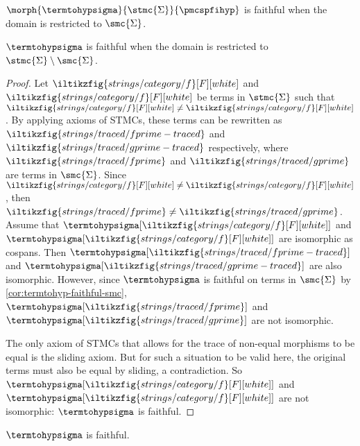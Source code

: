 \begin{corollary}\label{cor:termtohyp-faithful-smc}
    \(\morph{\termtohypsigma}{\stmc{\Sigma}}{\pmcspfihyp}\) is faithful when the domain is restricted to \(\smc{\Sigma}\).
\end{corollary}

\begin{theorem}
    \(\termtohypsigma\) is faithful when the domain is restricted to \(\stmc{\Sigma} \setminus \smc{\Sigma}\).
\end{theorem}
\begin{proof}
    Let \(\iltikzfig{strings/category/f}[F][white]\) and \(\iltikzfig{strings/category/f}[F][white]\) be terms in \(\stmc{\Sigma}\) such that \(\iltikzfig{strings/category/f}[F][white] \neq \iltikzfig{strings/category/f}[F][white]\).
    By applying axioms of STMCs, these terms can be rewritten as \(\iltikzfig{strings/traced/fprime-traced}\) and \(\iltikzfig{strings/traced/gprime-traced}\) respectively, where \(\iltikzfig{strings/traced/fprime}\) and \(\iltikzfig{strings/traced/gprime}\) are terms in \(\smc{\Sigma}\).
    Since \(\iltikzfig{strings/category/f}[F][white] \neq \iltikzfig{strings/category/f}[F][white]\), then \(\iltikzfig{strings/traced/fprime} \neq \iltikzfig{strings/traced/gprime}\).
    Assume that \(\termtohypsigma[\iltikzfig{strings/category/f}[F][white]]\) and \(\termtohypsigma[\iltikzfig{strings/category/f}[F][white]]\) are isomorphic as cospans.
    Then \(\termtohypsigma[\iltikzfig{strings/traced/fprime-traced}]\) and \(\termtohypsigma[\iltikzfig{strings/traced/gprime-traced}]\) are also isomorphic.
    However, since \(\termtohypsigma\) is faithful on terms in \(\smc{\Sigma}\)
    by \cref{cor:termtohyp-faithful-smc}, \(
        \termtohypsigma[\iltikzfig{strings/traced/fprime}]
    \) and \(
        \termtohypsigma[\iltikzfig{strings/traced/gprime}]
    \) are not isomorphic.

    The only axiom of STMCs that allows for the trace of non-equal morphisms to be equal is the sliding axiom.
    But for such a situation to be valid here, the original terms must also be equal by sliding, a contradiction.
    So \(\termtohypsigma[\iltikzfig{strings/category/f}[F][white]]\) and \(\termtohypsigma[\iltikzfig{strings/category/f}[F][white]]\) are not isomorphic: \(\termtohypsigma\) is faithful.
\end{proof}

\begin{corollary}
    \(\termtohypsigma\) is faithful.
\end{corollary}

